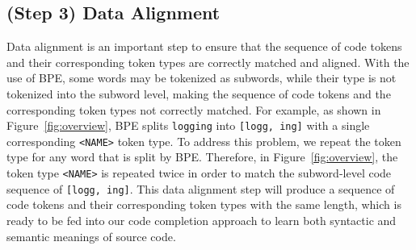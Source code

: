 \subsection{(Step 3) Data Alignment}
Data alignment is an important step to ensure that the sequence of code tokens and their corresponding token types are correctly matched and aligned.
With the use of BPE, some words may be tokenized as subwords, while their type is not tokenized into the subword level, making the sequence of code tokens and the corresponding token types not correctly matched.
For example, as shown in Figure~\ref{fig:overview}, BPE splits \texttt{logging} into \texttt{[logg, ing]} with a single corresponding \texttt{<NAME>} token type.
To address this problem, we repeat the token type for any word that is split by BPE.
Therefore, in Figure~\ref{fig:overview}, the token type \texttt{<NAME>} is repeated twice in order to match the subword-level code sequence of \texttt{[logg, ing]}.
This data alignment step will produce a sequence of code tokens and their corresponding token types with the same length, which is ready to be fed into our code completion approach to learn both syntactic and semantic meanings of source code.








 





